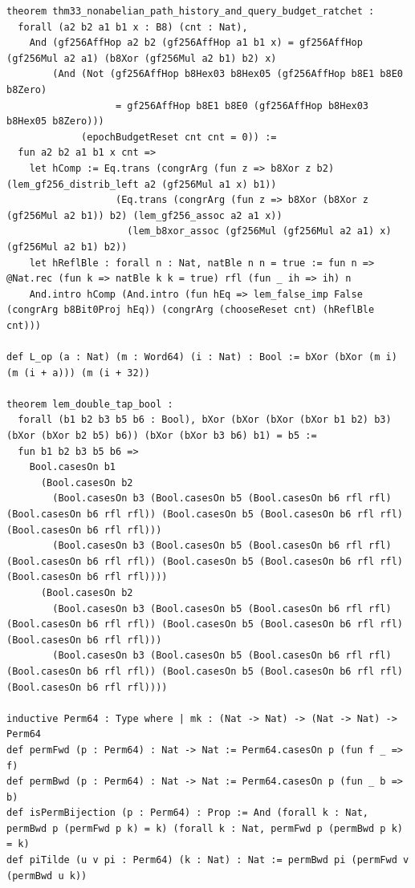 \documentclass[11pt,letterpaper]{article}
\theoremstyle{spectralthm}
\begin{document}
\begin{lstlisting}[language=Lean4,caption={Standalone Pure Init.Prelude Term-Mode Lean 4 Kernel Suite (thm30--thm61, v0.0.0, 0 sorry, 0 axioms).},label={lst:lean_unified}]
theorem thm33_nonabelian_path_history_and_query_budget_ratchet :
  forall (a2 b2 a1 b1 x : B8) (cnt : Nat),
    And (gf256AffHop a2 b2 (gf256AffHop a1 b1 x) = gf256AffHop (gf256Mul a2 a1) (b8Xor (gf256Mul a2 b1) b2) x)
        (And (Not (gf256AffHop b8Hex03 b8Hex05 (gf256AffHop b8E1 b8E0 b8Zero)
                   = gf256AffHop b8E1 b8E0 (gf256AffHop b8Hex03 b8Hex05 b8Zero)))
             (epochBudgetReset cnt cnt = 0)) :=
  fun a2 b2 a1 b1 x cnt =>
    let hComp := Eq.trans (congrArg (fun z => b8Xor z b2) (lem_gf256_distrib_left a2 (gf256Mul a1 x) b1))
                   (Eq.trans (congrArg (fun z => b8Xor (b8Xor z (gf256Mul a2 b1)) b2) (lem_gf256_assoc a2 a1 x))
                     (lem_b8xor_assoc (gf256Mul (gf256Mul a2 a1) x) (gf256Mul a2 b1) b2))
    let hReflBle : forall n : Nat, natBle n n = true := fun n => @Nat.rec (fun k => natBle k k = true) rfl (fun _ ih => ih) n
    And.intro hComp (And.intro (fun hEq => lem_false_imp False (congrArg b8Bit0Proj hEq)) (congrArg (chooseReset cnt) (hReflBle cnt)))

def L_op (a : Nat) (m : Word64) (i : Nat) : Bool := bXor (bXor (m i) (m (i + a))) (m (i + 32))

theorem lem_double_tap_bool :
  forall (b1 b2 b3 b5 b6 : Bool), bXor (bXor (bXor (bXor b1 b2) b3) (bXor (bXor b2 b5) b6)) (bXor (bXor b3 b6) b1) = b5 :=
  fun b1 b2 b3 b5 b6 =>
    Bool.casesOn b1
      (Bool.casesOn b2
        (Bool.casesOn b3 (Bool.casesOn b5 (Bool.casesOn b6 rfl rfl) (Bool.casesOn b6 rfl rfl)) (Bool.casesOn b5 (Bool.casesOn b6 rfl rfl) (Bool.casesOn b6 rfl rfl)))
        (Bool.casesOn b3 (Bool.casesOn b5 (Bool.casesOn b6 rfl rfl) (Bool.casesOn b6 rfl rfl)) (Bool.casesOn b5 (Bool.casesOn b6 rfl rfl) (Bool.casesOn b6 rfl rfl))))
      (Bool.casesOn b2
        (Bool.casesOn b3 (Bool.casesOn b5 (Bool.casesOn b6 rfl rfl) (Bool.casesOn b6 rfl rfl)) (Bool.casesOn b5 (Bool.casesOn b6 rfl rfl) (Bool.casesOn b6 rfl rfl)))
        (Bool.casesOn b3 (Bool.casesOn b5 (Bool.casesOn b6 rfl rfl) (Bool.casesOn b6 rfl rfl)) (Bool.casesOn b5 (Bool.casesOn b6 rfl rfl) (Bool.casesOn b6 rfl rfl))))

inductive Perm64 : Type where | mk : (Nat -> Nat) -> (Nat -> Nat) -> Perm64
def permFwd (p : Perm64) : Nat -> Nat := Perm64.casesOn p (fun f _ => f)
def permBwd (p : Perm64) : Nat -> Nat := Perm64.casesOn p (fun _ b => b)
def isPermBijection (p : Perm64) : Prop := And (forall k : Nat, permBwd p (permFwd p k) = k) (forall k : Nat, permFwd p (permBwd p k) = k)
def piTilde (u v pi : Perm64) (k : Nat) : Nat := permBwd pi (permFwd v (permBwd u k))


\end{lstlisting}
\end{document}
